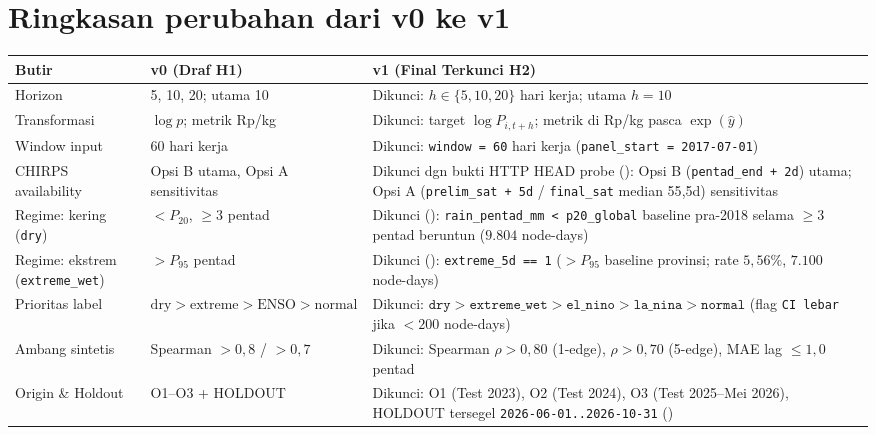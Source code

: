 \documentclass[11pt,a4paper]{article}
\begin{document}
\section{Ringkasan perubahan dari v0 ke v1}
\begin{table}[H]
\centering
\small
\begin{tabular}{@{}L{3.8cm}L{4.8cm}L{5.8cm}@{}}
\toprule
Butir & v0 (Draf H1) & v1 (Final Terkunci H2) \\
\midrule
Horizon & 5, 10, 20; utama 10 & Dikunci: $h \in \{5, 10, 20\}$ hari kerja; utama $h = 10$ \\
Transformasi & $\log p$; metrik Rp/kg & Dikunci: target $\log P_{i,t+h}$; metrik di Rp/kg pasca $\exp(\hat{y})$ \\
Window input & 60 hari kerja & Dikunci: \texttt{window = 60} hari kerja (\texttt{panel\_start = 2017-07-01}) \\
CHIRPS availability & Opsi B utama, Opsi A sensitivitas & Dikunci dgn bukti HTTP HEAD probe (): Opsi B (\texttt{pentad\_end + 2d}) utama; Opsi A (\texttt{prelim\_sat + 5d} / \texttt{final\_sat} median 55{,}5d) sensitivitas \\
Regime: kering (\texttt{dry}) & $< P_{20}$, $\ge 3$ pentad & Dikunci (): \texttt{rain\_pentad\_mm < p20\_global} baseline pra-2018 selama $\ge 3$ pentad beruntun ($9.804$ node-days) \\
Regime: ekstrem (\texttt{extreme\_wet}) & $> P_{95}$ pentad & Dikunci (): \texttt{extreme\_5d == 1} ($> P_{95}$ baseline provinsi; rate $5{,}56\%$, $7.100$ node-days) \\
Prioritas label & $\text{dry} > \text{extreme} > \text{ENSO} > \text{normal}$ & Dikunci: $\texttt{dry} > \texttt{extreme\_wet} > \texttt{el\_nino} > \texttt{la\_nina} > \texttt{normal}$ (flag \texttt{CI lebar} jika $< 200$ node-days) \\
Ambang sintetis & Spearman $> 0{,}8$ / $> 0{,}7$ & Dikunci: Spearman $\rho > 0{,}80$ (1-edge), $\rho > 0{,}70$ (5-edge), MAE lag $\le 1{,}0$ pentad \\
Origin \& Holdout & O1--O3 + HOLDOUT & Dikunci: O1 (Test 2023), O2 (Test 2024), O3 (Test 2025--Mei 2026), HOLDOUT tersegel \texttt{2026-06-01..2026-10-31} () \\
\bottomrule
\end{tabular}
\end{table}
\end{document}

